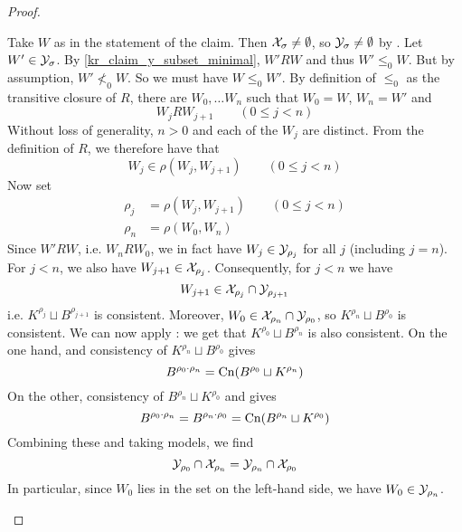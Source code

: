 \begin{proof}
\begin{claimproof}
        Take $W$ as in the statement of the claim. Then $\mathcal{X}_\sigma \ne
        \emptyset$, so $\mathcal{Y}_\sigma \ne \emptyset$ by
        \condcons{}. Let $W' \in \mathcal{Y}_\sigma$.  By
        \cref{kr_claim_y_subset_minimal}, $W' R W$ and thus $W' \le_0 W$. But by
        assumption, $W' \not<_0 W$. So we must have $W \le_0 W'$. By definition
        of $\le_0$ as the transitive closure of $R$, there are $W_0, \ldots
        W_n$ such that $W_0 = W$, $W_n = W'$ and
        \[
            W_j R W_{j+1} \qquad (0 \le j < n)
        \]
        Without loss of generality, $n > 0$ and each of the $W_j$ are distinct.
        From the definition of $R$, we therefore have that
        \[
            W_j \in \rho(W_j, W_{j+1}) \qquad (0 \le j < n)
        \]
        Now set
        \begin{align*}
            \rho_j &= \rho(W_j, W_{j+1}) \qquad (0 \le j < n) \\
            \rho_n &= \rho(W_0, W_n)
        \end{align*}
        Since $W' R W$, i.e. $W_n R W_0$, we in fact have $W_j \in \mathcal{Y}_{\rho_j}$
        for all $j$ (including $j = n$). For $j < n$, we also have $W_{j+1} \in
        \mathcal{X}_{\rho_j}$.\footnotemark{}
        Consequently, for $j < n$ we have
        \[
            W_{j+1} \in \mathcal{X}_{\rho_j} \cap \mathcal{Y}_{\rho_{j+1}}
        \]
        i.e. $K^{\rho_j} \sqcup B^{\rho_{j+1}}$ is consistent. Moreover, $W_0
        \in \mathcal{X}_{\rho_n} \cap \mathcal{Y}_{\rho_0}$, so $K^{\rho_n} \sqcup B^{\rho_0}$ is
        consistent. We can now apply \acyc{}: we get that $K^{\rho_0}
        \sqcup B^{\rho_n}$ is also consistent. On the one hand,
        \incvac{} and consistency of $K^{\rho_n} \sqcup
        B^{\rho_0}$ gives
        \[
            B^{\rho_0 \cdot \rho_n}
            = \operatorname{Cn}(B^{\rho_0} \sqcup K^{\rho_n})
        \]
        On the other, consistency of $B^{\rho_n} \sqcup K^{\rho_0}$ and
        \rearr{} gives
        \[
            B^{\rho_0 \cdot \rho_n}
            = B^{\rho_n \cdot \rho_0}
            = \operatorname{Cn}(B^{\rho_n} \sqcup K^{\rho_0})
        \]
        Combining these and taking models, we find
        \[
            \mathcal{Y}_{\rho_0} \cap \mathcal{X}_{\rho_n}
            =
            \mathcal{Y}_{\rho_n} \cap \mathcal{X}_{\rho_0}
        \]
        In particular, since $W_0$ lies in the set on the left-hand side, we
        have $W_0 \in \mathcal{Y}_{\rho_n}$.


\end{claimproof}
\end{proof}
